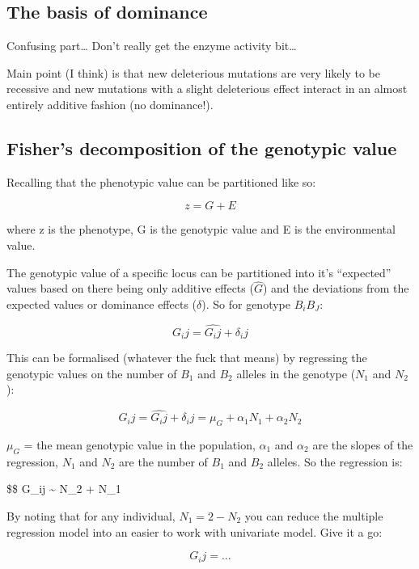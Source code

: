 \documentclass[
]{article}
\begin{document}
\hypertarget{the-basis-of-dominance}{%
\subsection{The basis of dominance}\label{the-basis-of-dominance}}

Confusing part\ldots{} Don't really get the enzyme activity bit\ldots{}

Main point (I think) is that new deleterious mutations are very likely
to be recessive and new mutations with a slight deleterious effect
interact in an almost entirely additive fashion (no dominance!).

\hypertarget{fishers-decomposition-of-the-genotypic-value}{%
\subsection{Fisher's decomposition of the genotypic
value}\label{fishers-decomposition-of-the-genotypic-value}}

Recalling that the phenotypic value can be partitioned like so:

\[ z = G + E \]

where z is the phenotype, G is the genotypic value and E is the
environmental value.

The genotypic value of a specific locus can be partitioned into it's
``expected'' values based on there being only additive effects
(\(\hat{G}\)) and the deviations from the expected values or dominance
effects (\(\delta\)). So for genotype \(B_iB_J\):

\[ G_ij = \hat{G_ij} + \delta_ij \]

This can be formalised (whatever the fuck that means) by regressing the
genotypic values on the number of \(B_1\) and \(B_2\) alleles in the
genotype (\(N_1\) and \(N_2\)):

\[ G_ij = \hat{G_ij} + \delta_ij = \mu_G + \alpha_1N_1 + \alpha_2N_2 \]

\(\mu_G\) = the mean genotypic value in the population, \(\alpha_1\) and
\(\alpha_2\) are the slopes of the regression, \(N_1\) and \(N_2\) are
the number of \(B_1\) and \(B_2\) alleles. So the regression is:

\$\$ G\_ij \textasciitilde{} N\_2 + N\_1

By noting that for any individual, \(N_1 = 2 - N_2\) you can reduce the
multiple regression model into an easier to work with univariate model.
Give it a go:

\[ G_ij = ... \]
\end{document}
